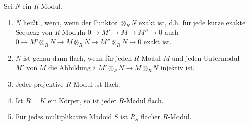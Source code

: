
\begin{DefProp}
\label{1.13}
  Sei $N$ ein $R$-Modul.
  \begin{enumerate}
    \item $N$ hei\ss t , wenn, wenn der Funktor $\otimes_R N$ exakt ist,
    d.h. f\"ur jede kurze exakte Sequenz von $R$-Moduln 
    $0\to M'\to M\to M''\to 0$
    auch $0\to M'\otimes_R N\to M\otimes_R N\to M''\otimes_R N\to 0$ exakt ist.
    \item $N$ ist genau dann flach, wenn f\"ur jeden $R$-Modul $M$ und jeden Untermodul $M'$ von $M$
    die Abbildung $i:M'\otimes_R N\to M\otimes_R N$ injektiv ist.
    \item Jeder projektive $R$-Modul ist flach.
    \item Ist $R=K$ ein K\"orper, so ist jeder $R$-Modul flach.
    \item F\"ur jedes multiplikative Modoid $S$ ist $R_S$ flacher $R$-Modul.
  \end{enumerate}
\end{DefProp}

